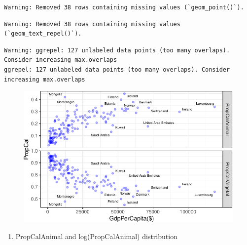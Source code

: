 \documentclass[
  letterpaper,
  DIV=11,
  numbers=noendperiod]{scrartcl}
\providecommand{\tightlist}{%
  \setlength{\itemsep}{0pt}\setlength{\parskip}{0pt}}\usepackage{longtable,booktabs,array}
\begin{document}
\begin{verbatim}
Warning: Removed 38 rows containing missing values (`geom_point()`).
\end{verbatim}

\begin{verbatim}
Warning: Removed 38 rows containing missing values (`geom_text_repel()`).
\end{verbatim}

\begin{verbatim}
Warning: ggrepel: 127 unlabeled data points (too many overlaps). Consider increasing max.overlaps
ggrepel: 127 unlabeled data points (too many overlaps). Consider increasing max.overlaps
\end{verbatim}

\begin{figure}[H]

{\centering \includegraphics{code_files/figure-pdf/unnamed-chunk-6-1.pdf}

}

\end{figure}

\begin{enumerate}
\def\labelenumi{\arabic{enumi}.}
\setcounter{enumi}{1}
\tightlist
\item
  PropCalAnimal and log(PropCalAnimal) distribution
\end{enumerate}
\end{document}
